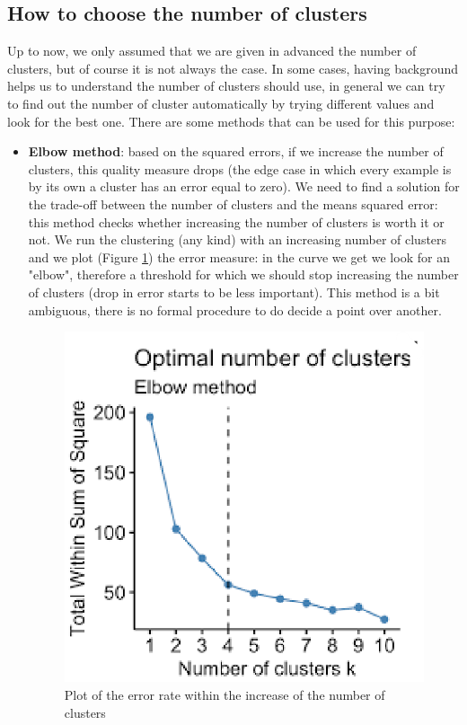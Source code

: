 \subsection{How to choose the number of clusters}
Up to now, we only assumed that we are given in advanced the number of clusters,
but of course it is not always the case. In some cases, having background helps us
to understand the number of clusters should use, in general we can try to find
out the number of cluster automatically by trying different values and look for
the best one. There are some methods that can be used for this purpose:
\begin{itemize}
	\item \textbf{Elbow method}: based on the squared errors, if we increase the
		number of clusters, this quality measure drops (the edge case in which every
		example is by its own a cluster has an error equal to zero). We need to find
		a solution for the trade-off between the number of clusters and the means
		squared error: this method checks whether increasing the number of clusters is
		worth it or not. We run the clustering (any kind) with an increasing number
		of clusters and we plot (Figure \ref{fig:elbow_method}) the error measure: in
		the curve we get we look for an "elbow", therefore a threshold for which we
		should stop increasing the number of clusters (drop in error starts to be less
		important). This method is a bit ambiguous, there is no formal procedure to
		do decide a point over another.
		\begin{figure}[H]
			\centering
			\includegraphics[scale=0.3]{
				images/18_UnsupervisedLearning_elbowMethod.png
			}
			\caption{Plot of the error rate within the increase of the number of
			clusters}
			\label{fig:elbow_method}
		\end{figure}


\end{itemize}

